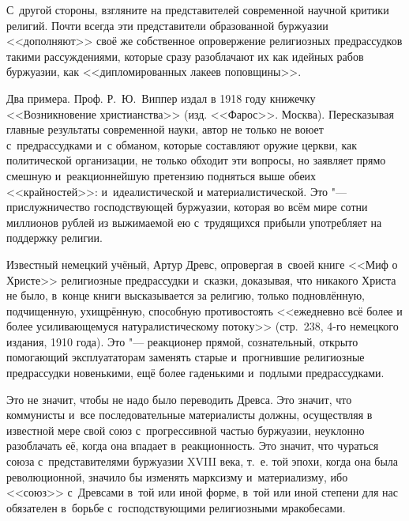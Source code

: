 С~другой стороны, взгляните на представителей современной научной критики
религий. Почти всегда эти представители образованной буржуазии <<дополняют>>
своё же собственное опровержение религиозных предрассудков такими
рассуждениями, которые сразу разоблачают их как идейных рабов буржуазии,
как <<дипломированных лакеев поповщины>>.

Два примера. Проф. Р.~Ю.~Виппер издал в 1918 году книжечку <<Возникновение
христианства>> (изд. <<Фарос>>. Москва). Пересказывая главные результаты
современной науки, автор не только не воюет с~предрассудками и~с обманом,
которые составляют оружие церкви, как политической организации, не только
обходит эти вопросы, но заявляет прямо смешную и~реакционнейшую претензию
подняться выше обеих <<крайностей>>: и~идеалистической и
материалистической. Это "--- прислужничество господствующей буржуазии,
которая во всём мире сотни миллионов рублей из выжимаемой ею с~трудящихся
прибыли употребляет на поддержку религии.

Известный немецкий учёный, Артур Древс, опровергая в~своей книге <<Миф о
Христе>> религиозные предрассудки и~сказки, доказывая, что никакого Христа
не было, в~конце книги высказывается за религию, только подновлённую,
подчищенную, ухищрённую, способную противостоять <<ежедневно всё более и
более усиливающемуся натуралистическому потоку>> (стр.~238, 4-го немецкого
издания, 1910 года). Это "--- реакционер прямой, сознательный, открыто
помогающий эксплуататорам заменять старые и~прогнившие религиозные
предрассудки новенькими, ещё более гаденькими и~подлыми предрассудками.

Это не значит, чтобы не надо было переводить Древса. Это значит, что
коммунисты и~все последовательные материалисты должны, осуществляя в
известной мере свой союз с~прогрессивной частью буржуазии, неуклонно
разоблачать её, когда она впадает в~реакционность. Это значит, что чураться
союза с~представителями буржуазии XVIII века, т.~е. той эпохи, когда она
была революционной, значило бы изменять марксизму и~материализму, ибо
<<союз>> с~Древсами в~той или иной форме, в~той или иной степени для нас
обязателен в~борьбе с~господствующими религиозными мракобесами.

